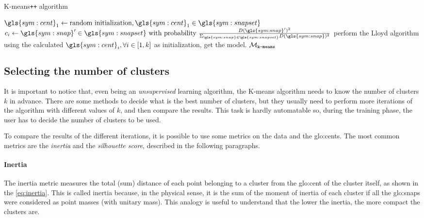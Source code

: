 \begin{algorithm}
  \caption{K-means\texttt{++} algorithm}
  \label{alg:kmeanspp}
\begin{algorithmic}[1]
  \State $\gls{sym:cent}_1 \gets \text{random initialization}, \gls{sym:cent}_1 \in \gls{sym:snapset}$
  \State $c_i \gets \gls{sym:snap}' \in \gls{sym:snapset} \text{ with probability } \frac{D(\gls{sym:snap}')^2}{\Sigma_{\gls{sym:snap}\in\gls{sym:snapset}}D(\gls{sym:snap})^2}$
  \EndFor
  \State perform the Lloyd algorithm using the calculated $\gls{sym:cent}_i, \forall i \in [1,k]$ as initialization, get the model.
  \State \Return $\mathcal{M}_{\text{\texttt{k-means}}}$  
  \EndFunction
\end{algorithmic}
\end{algorithm}

\subsection{Selecting the number of clusters}
It is important to notice that, even being an \emph{unsupervised} learning algorithm, the K-means algorithm needs to know the number of clusters $k$ in advance. There are some methods to decide what is the best number of clusters, but they usually need to perform more iterations of the algorithm with different values of $k$, and then compare the results. This task is hardly automatable so, during the training phase, the user has to decide the number of clusters to be used.

To compare the results of the different iterations, it is possible to use some metrics on the data and the {\gls{glo:cent}}s. The most common metrics are the \emph{inertia} and the \emph{silhouette score}, described in the following paragraphs.

\paragraph*{Inertia}
The inertia metric measures the total (sum) distance of each point belonging to a cluster from the {\gls{glo:cent}} of the cluster itself, as shown in the \autoref{eq:inertia}. This is called inertia because, in the physical sense, it is the sum of the moment of inertia of each cluster if all the {\gls{glo:snap}}s were considered as point masses (with unitary mass). This analogy is useful to understand that the lower the inertia, the more compact the clusters are.

